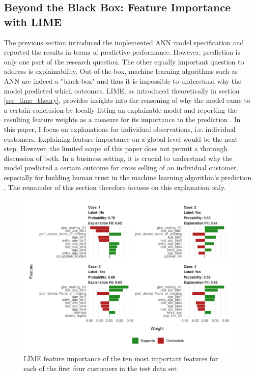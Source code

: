 \documentclass[12pt,a4paper]{article}
\begin{document}
\subsection{Beyond the Black Box: Feature Importance with LIME}
The previous section introduced the implemented ANN model specification and reported the results in terms of predictive performance.
However, prediction is only one part of the research question.
The other equally important question to address is explainability.
Out-of-the-box, machine learning algorithms such as ANN are indeed a "black-box" and thus it is impossible to understand why the model predicted which outcomes.
LIME, as introduced theoretically in section \ref{sec_lime_theory}, provides insights into the reasoning of why the model came to a certain
conclusion by locally fitting an explainable model and reporting the resulting feature weights as a measure for its importance to the prediction \citep{ribeiroWhyShouldTrust2016a}.
In this paper, I focus on explanations for individual observations, i.e. individual customers.
Explaining feature importance on a global level would be the next step.
However, the limited scope of this paper does not permit a thorough discussion of both.
In a business setting, it is crucial to understand why the model predicted a certain outcome for cross selling of an individual customer, especially for building human trust in the machine learning algorithm's prediction \citep{ribeiroWhyShouldTrust2016a}.
The remainder of this section therefore focuses on this explanation only.

\begin{figure}[ht]
	\centering
  \includegraphics[scale=0.83]{figures/lime_first_four.pdf}
	\caption{LIME feature importance of the ten most important features for each of the first four customers in the test data set}
	\label{fig_lime_four}
\end{figure}
\end{document}
